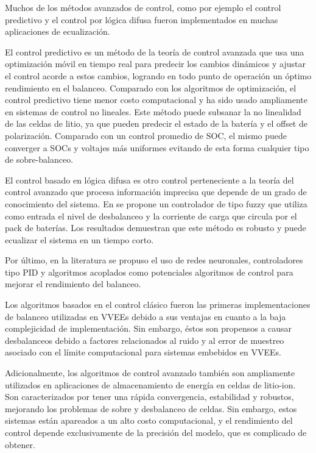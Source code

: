 \documentclass[10pt,a4paper]{article}
\newcounter{subsubsubsection}[subsubsection]
\begin{document}

Muchos de los m\'etodos avanzados de control, como por ejemplo el control
predictivo y el control por l\'ogica difusa fueron implementados en muchas
aplicaciones de ecualizaci\'on.

El control predictivo es un m\'etodo de la teor\'ia de control avanzada que usa
una optimizaci\'on m\'ovil en tiempo real para predecir los cambios din\'amicos
y ajustar el control acorde a estos cambios, logrando en todo punto de 
operaci\'on un \'optimo rendimiento en el balanceo. Comparado con los
algoritmos de optimizaci\'on, el control predictivo tiene menor costo
computacional y ha sido usado ampliamente en sistemas de control no lineales.
Este m\'etodo puede subsanar la no linealidad de las celdas de litio, ya que
pueden predecir el estado de la bater\'ia y el offset de polarizaci\'on.
Comparado con un control promedio de \acrshort{SOC}, el mismo puede converger a
\acrshort{SOC}s y voltajes m\'as uniformes evitando de esta forma cualquier tipo
de sobre-balanceo.

El control basado en l\'ogica difusa es otro control perteneciente a la teor\'ia
del control avanzado que procesa informaci\'on imprecisa que depende de un grado
de conocimiento del sistema. En \cite{jia_et_al_fuzzy} se propone un controlador 
de tipo fuzzy que utiliza como entrada el nivel de desbalanceo y la corriente de 
carga que circula por el pack de bater\'ias. Los resultados demuestran que este 
m\'etodo es robusto y puede ecualizar el sistema en un tiempo corto.

Por \'ultimo, en la literatura se propuso el uso de redes neuronales,
controladores tipo PID y algoritmos acoplados como potenciales algoritmos de
control para mejorar el rendimiento del balanceo.


Los algoritmos basados en el control cl\'asico fueron las primeras
implementaciones de balanceo utilizadas en \acrshort{VVEE}s debido a sus 
ventajas en cuanto a la baja complejicidad de implementaci\'on. Sin embargo, 
\'estos son propensos a causar desbalanceos debido a factores relacionados al 
ruido y al error de muestreo asociado con el l\'imite computacional para 
sistemas embebidos en \acrshort{VVEE}s.

Adicionalmente, los algoritmos de control avanzado tambi\'en son ampliamente
utilizados en aplicaciones de almacenamiento de energ\'ia en celdas de
litio-ion. Son caracterizados por tener una r\'apida convergencia, estabilidad y
robustos, mejorando los problemas de sobre y desbalanceo de celdas. Sin embargo,
estos sistemas est\'an apareados a un alto costo computacional, y el rendimiento
del control depende exclusivamente de la precisi\'on del modelo, que es
complicado de obtener.
\end{document}
